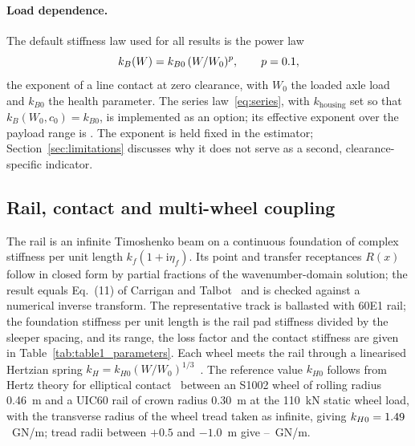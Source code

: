 \paragraph{Load dependence.} The default stiffness law used for all results is the power law
\begin{equation}
  k_B(W) = k_{B0}\,(W/W_0)^{p},\qquad p = 0.1,
  \label{eq:powerlaw}
\end{equation}
the exponent of a line contact at zero clearance, with $W_0$ the loaded axle load and $k_{B0}$ the
health parameter. The series law~\eqref{eq:series}, with $k_\mathrm{housing}$ set so that
$k_B(W_0, c_0) = k_{B0}$, is implemented as an option; its effective exponent over the payload range
is \PeffSeries{}. The exponent is held fixed in the estimator; Section~\ref{sec:limitations}
discusses why it does not serve as a second, clearance-specific indicator.

\subsection{Rail, contact and multi-wheel coupling}\label{sec:rail}
The rail is an infinite Timoshenko beam on a continuous foundation of complex stiffness per unit
length $k_f(1+\mathrm{i}\eta_f)$. Its point and transfer receptances $R(x)$ follow in closed form by
partial fractions of the wavenumber-domain solution; the result equals Eq.~(11) of
Carrigan and Talbot~\citep{carrigan2023} and is checked against a numerical inverse transform. The
representative track is ballasted with 60E1 rail; the foundation stiffness per unit length is the rail
pad stiffness divided by the sleeper spacing, and its range, the loss factor and
the contact stiffness are given in Table~\ref{tab:table1_parameters}.
Each wheel meets the rail through a linearised Hertzian spring
$k_H = k_{H0}(W/W_0)^{1/3}$~\citep{carrigan2023}. The reference value $k_{H0}$ follows from Hertz
theory for elliptical contact~\citep{johnson1985} between an S1002 wheel of rolling radius 0.46~m and
a UIC60 rail of crown radius 0.30~m at the 110~kN static wheel load, with the transverse radius of the
wheel tread taken as infinite, giving $k_{H0} = 1.49$~GN/m; tread radii between $+0.5$ and
$-1.0$~m give \KHZeroLo--\KHZeroHi~GN/m.

